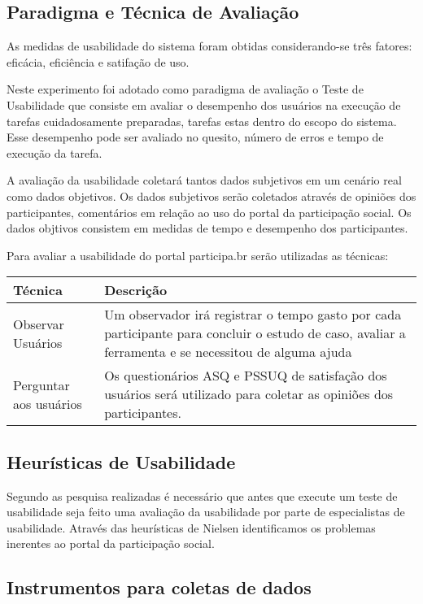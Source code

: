 \subsection{Paradigma e Técnica de Avaliação}

As medidas de usabilidade do sistema foram obtidas considerando-se três fatores: eficácia, eficiência e satifação de uso.

Neste experimento foi adotado como paradigma de avaliação o Teste de Usabilidade que consiste em avaliar o desempenho dos usuários na execução de tarefas cuidadosamente preparadas, tarefas estas dentro do escopo do sistema. Esse desempenho pode ser avaliado no quesito, número de erros e tempo de execução da tarefa.

A avaliação da usabilidade coletará tantos dados subjetivos em um cenário real como dados objetivos. Os dados subjetivos serão coletados através de opiniões dos participantes, comentários em relação ao uso do portal da participação social. Os dados objtivos consistem em medidas de tempo e desempenho dos participantes.

Para avaliar a usabilidade do portal participa.br serão utilizadas as técnicas:

\begin{table}[h]
\begin{tabular}{|l| p{10cm} |}
\hline
Técnica & Descrição \\ \hline
Observar Usuários & Um observador irá registrar o tempo 
gasto por cada participante para concluir o estudo de caso, 
avaliar a ferramenta e se necessitou de alguma ajuda    \\ \hline
Perguntar aos usuários & Os questionários ASQ e PSSUQ 
de satisfação dos usuários será utilizado 
para coletar as opiniões dos participantes.\\ \hline
\end{tabular}
\end{table}

\subsection{Heurísticas de Usabilidade}

	Segundo as pesquisa realizadas é necessário que antes que execute um teste de usabilidade seja feito uma avaliação da usabilidade por parte de especialistas de usabilidade. Através das heurísticas de Nielsen identificamos os problemas inerentes ao portal da participação social.

\subsection{Instrumentos para coletas de dados}

